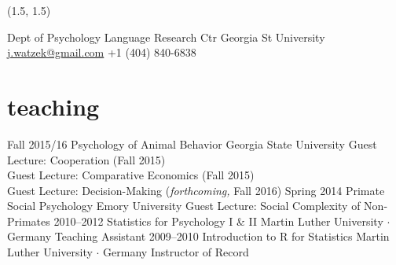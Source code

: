 \documentclass[]{friggeri-cv}
\begin{document}
\renewenvironment{aside}{%
  \let\oldsection\section
  \renewcommand{\section}[1]{
    \par\vspace{\baselineskip}{\Large\headingfont\color{headercolor} ##1}
  }
  \begin{textblock}{3.6}(1.5, 1.5)
  \begin{flushright}
  \obeycr
}{%
  \restorecr
  \end{flushright}
  \end{textblock}
  \let\section\oldsection
}


\begin{aside}
  \section{{\normalfont julia}watzek}
    Dept of Psychology
    Language Research Ctr
    Georgia St University
    ~
    \href{mailto:j.watzek@gmail.com}{j.watzek@gmail.com}
    +1 (404) 840-6838
\end{aside}


\section{teaching}

\begin{entrylist}
  \entry
    {Fall 2015/16}
    {Psychology of Animal Behavior}
    {Georgia State University}
    {Guest Lecture: Cooperation (Fall 2015)\\
    Guest Lecture: Comparative Economics (Fall 2015)\\
    Guest Lecture: Decision-Making (\emph{forthcoming,} Fall 2016)}
  \entry
    {Spring 2014}
    {Primate Social Psychology}
    {Emory University}
    {Guest Lecture: Social Complexity of Non-Primates}
  \entry
    {2010--2012}
    {Statistics for Psychology I \& II}
    {Martin Luther University $\cdot$ Germany}
    {Teaching Assistant}
  \entry
    {2009--2010}
    {Introduction to R for Statistics}
    {Martin Luther University $\cdot$ Germany}
    {Instructor of Record}
\end{entrylist}
\end{document}
